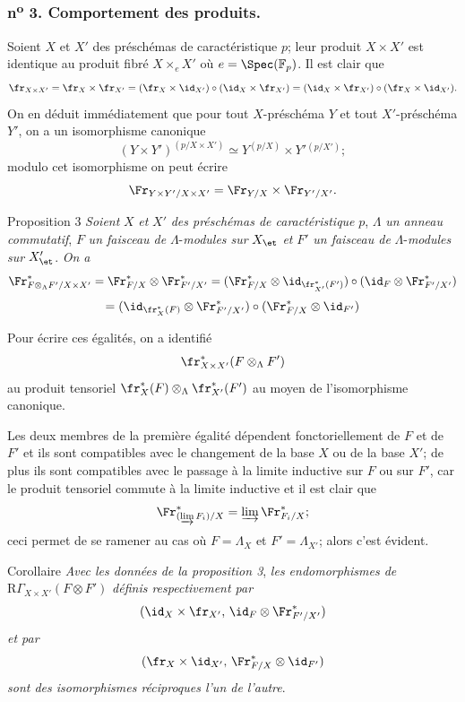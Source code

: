 \subsubsection*{n\textsuperscript{o} 3. Comportement des produits.}

Soient $X$ et $X'$ des préschémas de caractéristique $p$; leur produit $X\times X'$ est identique au produit fibré $X\times_eX'$ où $e=\Spec(\mathbb{F}_p)$. Il est clair que
\[
\fr_{X\times X'}=\fr_X\times\fr_{X'}=(\fr_X\times\id_{X'})\circ(\id_X\times\fr_{X'})
=(\id_X\times\fr_{X'})\circ(\fr_X\times\id_{X'}).
\]
On en déduit immédiatement que pour tout $X$-préschéma $Y$ et tout $X'$-préschéma $Y'$, on a un isomorphisme canonique
\[
(Y\times Y')^{(p/X\times X')}\simeq Y^{(p/X)}\times Y'{}^{(p/X')};
\]
modulo cet isomorphisme on
peut écrire
\[
\Fr_{Y\times Y'/X\times X'}=\Fr_{Y/X}\times\Fr_{Y'/X'}.
\]

\begin{statement}{Proposition 3}
\emph{Soient} $X$ \emph{et} $X'$ \emph{des préschémas de caractéristique} $p$, $\Lambda$ \emph{un anneau commutatif}, $F$ \emph{un faisceau de} $\Lambda$-\emph{modules sur} $X_{\et}$ \emph{et} $F'$ \emph{un faisceau de} $\Lambda$-\emph{modules sur} $X'_{\et}$. \emph{On a}
\[
\Fr^*_{F\otimes_\Lambda F'/X\times X'}
=\Fr^*_{F/X}\otimes\Fr^*_{F'/X'}
=(\Fr^*_{F/X}\otimes\id_{\fr_{X'}^*(F')})\circ
(\id_F\otimes\Fr^*_{F'/X'})
\]
\[
=(\id_{\fr_X^*(F)}\otimes\Fr^*_{F'/X'})\circ
(\Fr^*_{F/X}\otimes\id_{F'})
\]
\end{statement}

Pour écrire ces égalités, on a identifié
\[
\fr_{X\times X'}^*(F\otimes_\Lambda F')
\]
au produit tensoriel $\fr_X^*(F)\otimes_\Lambda\fr_{X'}^*(F')$ au moyen de l'isomorphisme canonique.

Les deux membres de la première égalité dépendent fonctoriellement de $F$ et de $F'$ et ils sont compatibles avec le changement de la base $X$ ou de la base $X'$; de plus ils sont compatibles avec le passage à la limite inductive sur $F$ ou sur $F'$, car le produit tensoriel commute à la limite inductive et il est clair que
\[
\Fr^*_{(\varinjlim F_i)/X}=\varinjlim\Fr^*_{F_i/X};
\]
ceci permet de se ramener au cas où $F=\Lambda_X$ et $F'=\Lambda_{X'}$; alors c'est évident.

\begin{statement}{Corollaire}
\emph{Avec les données de la proposition 3}, \emph{les endomorphismes de} $\mathrm{R}\Gamma_{X\times X'}(F\otimes F')$ \emph{définis respectivement par}
\[
(\id_X\times\fr_{X'},\,\id_F\otimes\Fr^*_{F'/X'})
\]
\emph{et par}
\[
(\fr_X\times\id_{X'},\,\Fr^*_{F/X}\otimes\id_{F'})
\]
\emph{sont des isomorphismes réciproques l'un de l'autre}.
\end{statement}

